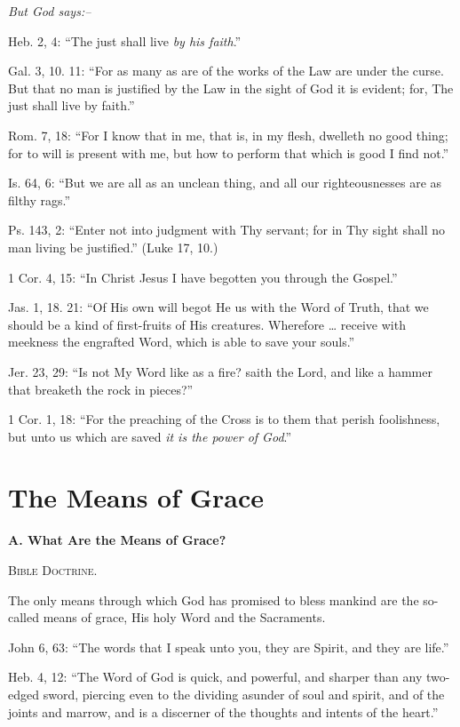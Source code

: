 \documentclass[
]{book}
\begin{document}
\begin{center}
\textsl{But God says:--}
\end{center}

Heb. 2, 4: ``The just shall live \emph{by his faith}.''

Gal. 3, 10. 11: ``For as many as are of the works of the Law are under the curse. But that no man is justified by the Law in the sight of God it is evident; for, The just shall live by faith.''

Rom. 7, 18: ``For I know that in me, that is, in my flesh, dwelleth no good thing; for to will is present with me, but how to perform that which is good I find not.''

Is. 64, 6: ``But we are all as an unclean thing, and all our righteousnesses are as filthy rags.''

Ps. 143, 2: ``Enter not into judgment with Thy servant; for in Thy sight shall no man living be justified.'' (Luke 17, 10.)

1 Cor. 4, 15: ``In Christ Jesus I have begotten you through the Gospel.''

Jas. 1, 18. 21: ``Of His own will begot He us with the Word of Truth, that we should be a kind of first-fruits of His creatures. Wherefore \ldots{} receive with meekness the engrafted Word, which is able to save your souls.''

Jer. 23, 29: ``Is not My Word like as a fire? saith the Lord, and like a hammer that breaketh the rock in pieces?''

1 Cor. 1, 18: ``For the preaching of the Cross is to them that perish foolishness, but unto us which are saved \emph{it is the power of God}.''

\section{The Means of Grace}\label{the-means-of-grace}

\begin{center}
\textbf{A.  What Are the Means of Grace?}

\textsc{Bible Doctrine.}
\end{center}

The only means through which God has promised to bless mankind are the so-called means of grace, His holy Word and the Sacraments.

John 6, 63: ``The words that I speak unto you, they are Spirit, and they are life.''

Heb. 4, 12: ``The Word of God is quick, and powerful, and sharper than any two-edged sword, piercing even to the dividing asunder of soul and spirit, and of the joints and marrow, and is a discerner of the thoughts and intents of the heart.''
\end{document}
